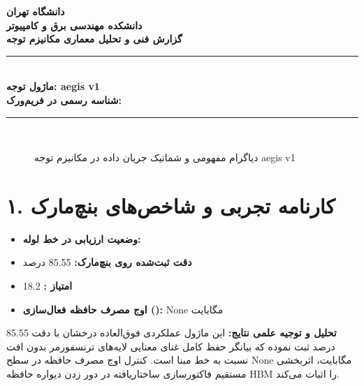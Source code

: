 \documentclass[12pt,a4paper]{article}
\begin{document}
\begin{center}
{\Large\bfseries دانشگاه تهران}\\[0.2cm]
{\large\bfseries دانشکده مهندسی برق و کامپیوتر}\\[0.2cm]
{\large\bfseries گزارش فنی و تحلیل معماری مکانیزم توجه}\\[0.5cm]
\rule{\linewidth}{1pt}\\[0.3cm]
{\LARGE\bfseries ماژول توجه: aegis v1}\\[0.2cm]
{\large \textbf{شناسه رسمی در فریم‌ورک:} }\\[0.2cm]
\rule{\linewidth}{1pt}\\[0.5cm]
\end{center}

\begin{figure}[H]
\centering
{}
\caption{دیاگرام مفهومی و شماتیک جریان داده در مکانیزم توجه aegis v1}
\end{figure}

\section*{۱. کارنامه تجربی و شاخص‌های بنچ‌مارک}
\begin{itemize}
\item \textbf{وضعیت ارزیابی در خط لوله:} 
\item \textbf{دقت ثبت‌شده روی بنچ‌مارک:} 85.55 درصد
\item \textbf{امتیاز :} 18.2
\item \textbf{اوج مصرف حافظه فعال‌سازی ():} None مگابایت
\end{itemize}
\textbf{تحلیل و توجیه علمی نتایج:} این ماژول عملکردی فوق‌العاده درخشان با دقت 85.55 درصد ثبت نموده که بیانگر حفظ کامل غنای معنایی لایه‌های ترنسفورمر بدون افت نسبت به خط مبنا است. کنترل اوج مصرف حافظه در سطح None مگابایت، اثربخشی مستقیم فاکتورسازی ساختاریافته در دور زدن دیواره حافظه HBM را اثبات می‌کند.
\end{document}
